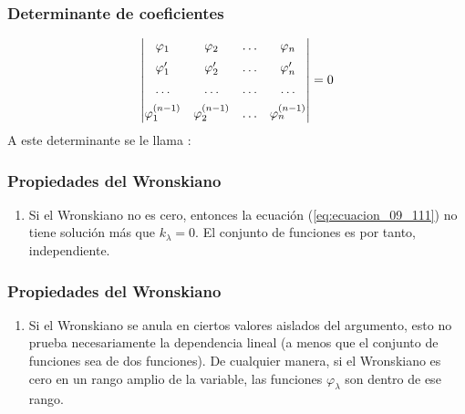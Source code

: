 \documentclass[12pt]{beamer}
\begin{document}
\begin{frame}
\frametitle{Determinante de coeficientes}
\begin{align*}
\mdet{
\varphi_{1} & \varphi_{2} & \ldots & \varphi_{n} \\[0.5em]
\pderivada{\varphi}_{1} & \pderivada{\varphi}_{2} & \ldots & \pderivada{\varphi}_{n} \\[0.5em]
\ldots & \ldots & \ldots & \ldots \\[0.5em]
\varphi^{(n-1)}_{1} & \varphi^{(n-1)}_{2} & \ldots & \varphi^{(n-1)}_{n} \\
} = 0
\end{align*}
A este determinante se le llama :
\end{frame}
\begin{frame}
\frametitle{Propiedades del Wronskiano}
\fontsize{12}{12}\selectfont
\begin{enumerate}[<+->]
\item Si el Wronskiano no es cero, entonces la ecuación (\ref{eq:ecuacion_09_111}) no tiene solución más que $k_{\lambda} = 0$. El conjunto de funciones es por tanto, independiente.
\seti
\end{enumerate}
\end{frame}
\begin{frame}
\frametitle{Propiedades del Wronskiano}
\fontsize{12}{12}\selectfont
\begin{enumerate}[<+->]
\conti
\item Si el Wronskiano se anula en ciertos valores aislados del argumento, esto no prueba necesariamente la dependencia lineal (a menos que el conjunto de funciones sea de dos funciones). De cualquier manera, si el Wronskiano es cero en un rango amplio de la variable, las funciones $\varphi_{\lambda}$ son  dentro de ese rango.
\end{enumerate}
\end{frame}
\end{document}

